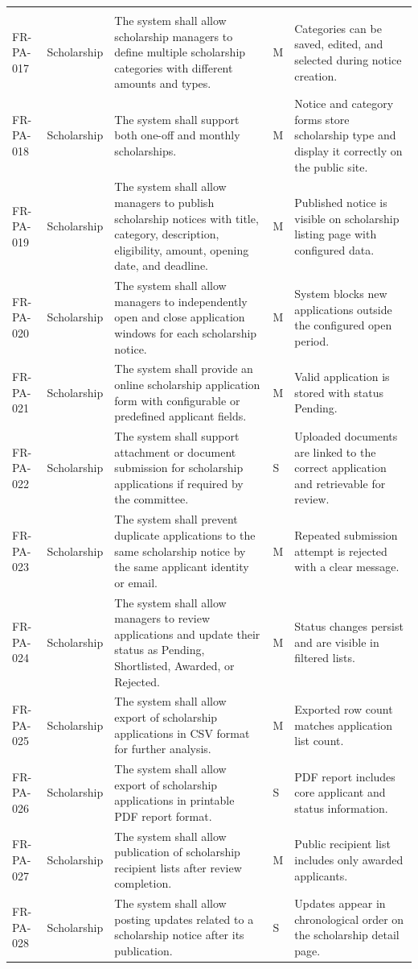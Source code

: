 \documentclass[12pt,a4paper]{article}
\begin{document}
\begin{longtable}{@{}L{2cm}L{2.4cm}L{6cm}C{0.9cm}L{3.4cm}@{}}
\\
FR-PA-017 & Scholarship & The system shall allow scholarship managers to define multiple scholarship categories with different amounts and types. & M & Categories can be saved, edited, and selected during notice creation. \\
FR-PA-018 & Scholarship & The system shall support both one-off and monthly scholarships. & M & Notice and category forms store scholarship type and display it correctly on the public site. \\
FR-PA-019 & Scholarship & The system shall allow managers to publish scholarship notices with title, category, description, eligibility, amount, opening date, and deadline. & M & Published notice is visible on scholarship listing page with configured data. \\
FR-PA-020 & Scholarship & The system shall allow managers to independently open and close application windows for each scholarship notice. & M & System blocks new applications outside the configured open period. \\
FR-PA-021 & Scholarship & The system shall provide an online scholarship application form with configurable or predefined applicant fields. & M & Valid application is stored with status Pending. \\
FR-PA-022 & Scholarship & The system shall support attachment or document submission for scholarship applications if required by the committee. & S & Uploaded documents are linked to the correct application and retrievable for review. \\
FR-PA-023 & Scholarship & The system shall prevent duplicate applications to the same scholarship notice by the same applicant identity or email. & M & Repeated submission attempt is rejected with a clear message. \\
FR-PA-024 & Scholarship & The system shall allow managers to review applications and update their status as Pending, Shortlisted, Awarded, or Rejected. & M & Status changes persist and are visible in filtered lists. \\
FR-PA-025 & Scholarship & The system shall allow export of scholarship applications in CSV format for further analysis. & M & Exported row count matches application list count. \\
FR-PA-026 & Scholarship & The system shall allow export of scholarship applications in printable PDF report format. & S & PDF report includes core applicant and status information. \\
FR-PA-027 & Scholarship & The system shall allow publication of scholarship recipient lists after review completion. & M & Public recipient list includes only awarded applicants. \\
FR-PA-028 & Scholarship & The system shall allow posting updates related to a scholarship notice after its publication. & S & Updates appear in chronological order on the scholarship detail page. \\


\end{longtable}
\end{document}
